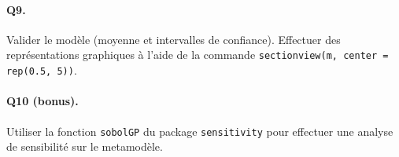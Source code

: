 \documentclass[12pt]{scrartcl}
\begin{document}
\paragraph{Q9. } Valider le modèle (moyenne et intervalles de confiance). Effectuer des représentations graphiques à l'aide de la commande \texttt{sectionview(m, center = rep(0.5, 5))}. 

\paragraph{Q10 (bonus).} Utiliser la fonction \texttt{sobolGP} du package \texttt{sensitivity} pour effectuer une analyse de sensibilité sur le metamodèle.
\end{document}
